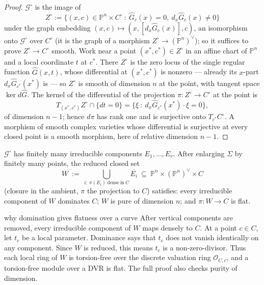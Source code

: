 \documentclass[acmsmall,screen,nonacm]{acmart}
\theoremstyle{definition}
\theoremstyle{remark}
\newcommand{\PP}{\mathbb{P}}
\newcommand{\OO}{\mathcal{O}}
\newcommand{\Gfam}{\mathcal{G}}
\begin{document}
\begin{proof}
$\Gfam^\circ$ is the image of
\[
  Z^\circ:=\big\{(x,c)\in\PP^n\times C^\circ\ :\
  \widehat G_c(x)=0,\ d_x\widehat G_c(x)\ne0\big\}
\]
under the graph embedding
$(x,c)\mapsto(x,[d_x\widehat G_c(x)],c)$, an isomorphism onto
$\Gfam^\circ$ over $C^\circ$ (it is the graph of a morphism
$Z^\circ\to(\PP^n)^\vee$); so it suffices to prove
$Z^\circ\to C^\circ$ smooth.  Work near a point
$(x^*,c^*)\in Z^\circ$ in an affine chart of $\PP^n$ and a local
coordinate $t$ at $c^*$.  There $Z^\circ$ is the zero locus of the
single regular function $\widehat G(x,t)$, whose differential at
$(x^*,c^*)$ is nonzero --- already its $x$-part
$d_x\widehat G_{c^*}(x^*)$ is --- so $Z^\circ$ is smooth of dimension
$n$ at the point, with tangent space $\ker d\widehat G$.  The kernel
of the differential of the projection $\pi:Z^\circ\to C^\circ$ at the
point is
\[
  T_{(x^*,c^*)}Z^\circ\cap\{dt=0\}
  =\big\{\xi\ :\ d_x\widehat G_{c^*}(x^*)\cdot\xi=0\big\},
\]
of dimension $n-1$; hence $d\pi$ has rank one and is surjective onto
$T_{c^*}C^\circ$.  A morphism of smooth complex varieties whose
differential is surjective at every closed point is a smooth morphism,
here of relative dimension $n-1$.
\end{proof}

\begin{lemma}\label{lem:family}
$\Gfam^\circ$ has finitely many irreducible components
$E_1,\dots,E_r$.  After enlarging $\Sigma$ by finitely many points,
the reduced closed set
\[
  W\ :=\ \bigcup_{i:\ \pi(E_i)\ \mathrm{dense\ in}\ C}
  \overline{E_i}
  \ \subseteq\ \PP^n\times(\PP^n)^\vee\times C
\]
(closure in the ambient, $\pi$ the projection to $C$) satisfies:
every irreducible component of $W$ dominates $C$; $W$ is pure of
dimension $n$; and $\pi:W\to C$ is flat.
\end{lemma}

\begin{roadmapbox}{why domination gives flatness over a curve}
After vertical components are removed, every irreducible component of $W$
maps densely to $C$.  At a point $c\in C$, let $t_c$ be a local parameter.
Dominance says that $t_c$ does not vanish identically on any component.  Since
$W$ is reduced, this means $t_c$ is a non-zero-divisor.  Thus each local ring
of $W$ is torsion-free over the discrete valuation ring $\OO_{C,c}$, and a
torsion-free module over a DVR is flat.  The full proof also checks purity
of dimension.
\end{roadmapbox}
\end{document}
